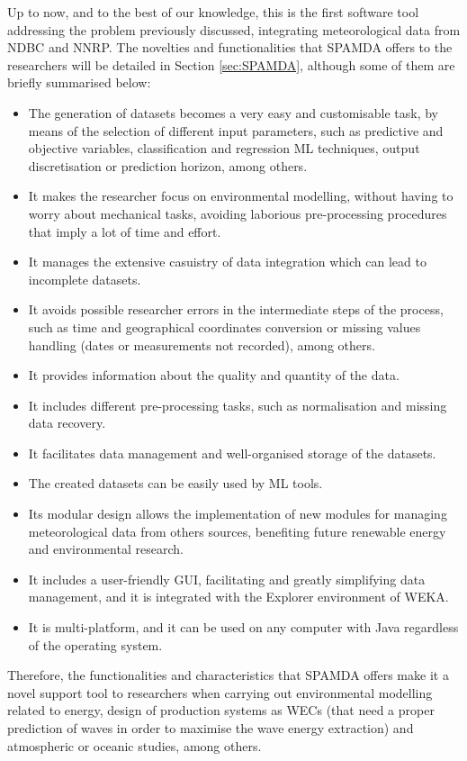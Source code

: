 \documentclass[review]{elsarticle}
\begin{document}
		Up to now, and to the best of our knowledge, this is the first software tool addressing the problem previously discussed, integrating meteorological data from NDBC and NNRP. The novelties and functionalities that SPAMDA offers to the researchers will be detailed in Section \ref{sec:SPAMDA}, although some of them are briefly summarised below:
		\begin{itemize}
			\item The generation of datasets becomes a very easy and customisable task, by means of the selection of different input parameters, such as predictive and objective variables, classification and regression ML techniques, output discretisation or prediction horizon, among others.
			\item It makes the researcher focus on environmental modelling, without having to worry about mechanical tasks, avoiding laborious pre-processing procedures that imply a lot of time and effort.
			\item It manages the extensive casuistry of data integration which can lead to incomplete datasets.
			\item It avoids possible researcher errors in the intermediate steps of the process, such as time and geographical coordinates conversion or missing values handling (dates or measurements not recorded), among others.
			\item It provides information about the quality and quantity of the data.
			\item It includes different pre-processing tasks, such as normalisation and missing data recovery.
			\item It facilitates data management and well-organised storage of the datasets.
			\item The created datasets can be easily used by ML tools.
			\item Its modular design allows the implementation of new modules for managing meteorological data from others sources, benefiting future renewable energy and environmental research.
			\item It includes a user-friendly GUI, facilitating and greatly simplifying data management, and it is integrated with the Explorer environment of WEKA.
			\item It is multi-platform, and it can be used on any computer with Java regardless of the operating system.
		\end{itemize}
		
		Therefore, the functionalities and characteristics that SPAMDA offers make it a novel support tool to researchers when carrying out environmental modelling related to energy, design of production systems as WECs (that need a proper prediction of waves in order to maximise the wave energy extraction) and atmospheric or oceanic studies, among others.
			
\end{document}
